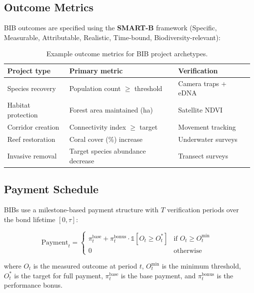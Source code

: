 \documentclass[11pt,a4paper]{article}
\begin{document}
\subsection{Outcome Metrics}

BIB outcomes are specified using the \textbf{SMART-B} framework
(Specific, Measurable, Attributable, Realistic, Time-bound,
Biodiversity-relevant):

\begin{table}[H]
\centering
\caption{Example outcome metrics for BIB project archetypes.}
\label{tab:metrics}
\begin{tabular}{p{3cm}p{4cm}p{4cm}}
\toprule
\textbf{Project type} & \textbf{Primary metric} & \textbf{Verification} \\
\midrule
Species recovery & Population count $\geq$ threshold & Camera traps + eDNA \\
Habitat protection & Forest area maintained (ha) & Satellite NDVI \\
Corridor creation & Connectivity index $\geq$ target & Movement tracking \\
Reef restoration & Coral cover (\%) increase & Underwater surveys \\
Invasive removal & Target species abundance decrease & Transect surveys \\
\bottomrule
\end{tabular}
\end{table}

\subsection{Payment Schedule}

BIBs use a milestone-based payment structure with $T$ verification
periods over the bond lifetime $[0, \tau]$:

\begin{equation}
  \text{Payment}_t = \begin{cases}
    \pi_t^{\text{base}} + \pi_t^{\text{bonus}} \cdot \mathbb{1}[O_t \geq O_t^*]
    & \text{if } O_t \geq O_t^{\min} \\
    0 & \text{otherwise}
  \end{cases}
\end{equation}

where $O_t$ is the measured outcome at period $t$, $O_t^{\min}$ is the
minimum threshold, $O_t^*$ is the target for full payment,
$\pi_t^{\text{base}}$ is the base payment, and $\pi_t^{\text{bonus}}$
is the performance bonus.
\end{document}
